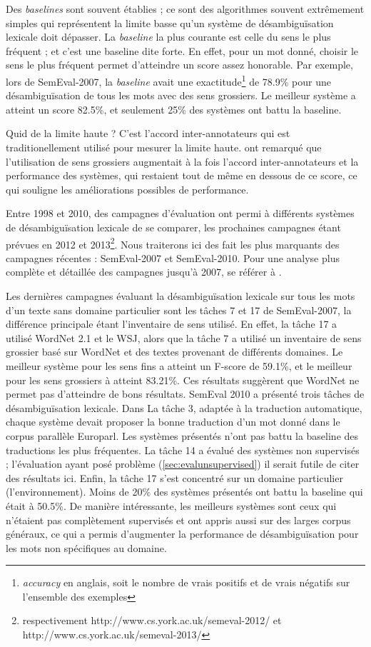 Des \textit{baselines} sont souvent établies ; ce sont des algorithmes souvent
extrêmement simples qui représentent la limite basse qu'un système de
désambiguïsation lexicale doit dépasser. La \textit{baseline} la plus courante
est celle du sens le plus fréquent ; et c'est une baseline dite forte. En
effet, pour un mot donné, choisir le sens le plus fréquent permet d'atteindre
un score assez honorable. Par exemple, lors de SemEval-2007, la
\textit{baseline} avait une exactitude\footnote{\textit{accuracy} en anglais,
soit le nombre de vrais positifs et de vrais négatifs sur l'ensemble des
exemples} de 78.9\% pour une désambiguïsation de tous les mots avec des sens
grossiers. Le meilleur système a atteint un score 82.5\%, et seulement 25\% des
systèmes ont battu la baseline.

Quid de la limite haute ? C'est l'accord inter-annotateurs qui est
traditionellement utilisé pour mesurer la limite haute.
\cite{navigli2007semeval} ont remarqué que l'utilisation de sens grossiers
augmentait à la fois l'accord inter-annotateurs et la performance des systèmes,
qui restaient tout de même en dessous de ce score, ce qui souligne les
améliorations possibles de performance.

Entre 1998 et 2010, des campagnes d'évaluation ont permi à différents systèmes
de désambiguïsation lexicale de se comparer, les prochaines campagnes étant
prévues en 2012 et 2013\footnote{respectivement
http://www.cs.york.ac.uk/semeval-2012/ et
http://www.cs.york.ac.uk/semeval-2013/}. Nous traiterons ici des fait les plus
marquants des campagnes récentes : SemEval-2007 et SemEval-2010. Pour une
analyse plus complète et détaillée des campagnes jusqu'à 2007, se référer à
\cite{navigli2009word}.

Les dernières campagnes évaluant la désambiguïsation lexicale sur tous les mots
d'un texte sans domaine particulier sont les tâches 7 et 17 de SemEval-2007, la
différence principale étant l'inventaire de sens utilisé. En effet, la tâche 17
a utilisé WordNet 2.1 et le WSJ, alors que la tâche 7 a utilisé un inventaire
de sens grossier basé sur WordNet et des textes provenant de différents
domaines. Le meilleur système pour les sens fins a atteint un F-score de
59.1\%, et le meilleur pour les sens grossiers à atteint 83.21\%. Ces résultats
suggèrent que WordNet ne permet pas d'atteindre de bons résultats. SemEval 2010
a présenté trois tâches de désambiguïsation lexicale. Dans La tâche 3, adaptée
à la traduction automatique, chaque système devait proposer la bonne traduction
d'un mot donné dans le corpus parallèle Europarl. Les systèmes présentés n'ont
pas battu la baseline des traductions les plus fréquentes. La tâche 14 a évalué
des systèmes non supervisés ; l'évaluation ayant posé problème
(\ref{sec:evalunsupervised}) il serait futile de citer des résultats ici.
Enfin, la tâche 17 s'est concentré sur un domaine particulier
(l'environnement). Moins de 20\% des systèmes présentés ont battu la baseline
qui était à 50.5\%. De manière intéressante, les meilleurs systèmes sont ceux
qui n'étaient pas complètement supervisés et ont appris aussi sur des larges
corpus généraux, ce qui a permis d'augmenter la performance de désambiguïsation
pour les mots non spécifiques au domaine.


